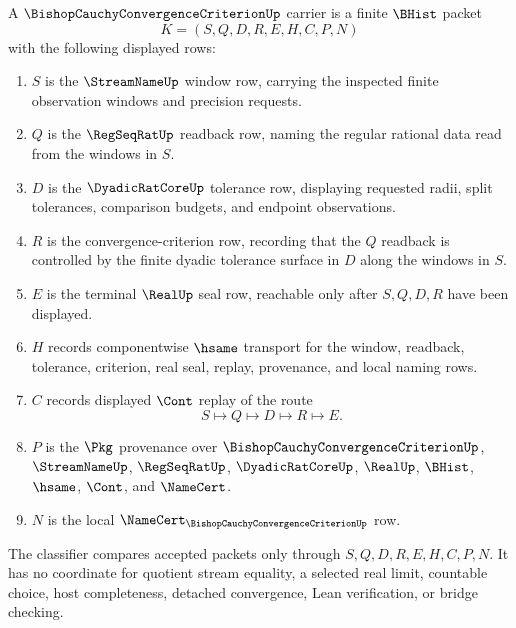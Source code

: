 \begin{definition}
\label{def:bishop-cauchy-convergence-criterion-carrier}
A $\BishopCauchyConvergenceCriterionUp$ carrier is a finite $\BHist$ packet
$$
K=(S,Q,D,R,E,H,C,P,N)
$$
with the following displayed rows:
\begin{enumerate}
\item $S$ is the $\StreamNameUp$ window row, carrying the inspected finite observation windows and precision requests.
\item $Q$ is the $\RegSeqRatUp$ readback row, naming the regular rational data read from the windows in $S$.
\item $D$ is the $\DyadicRatCoreUp$ tolerance row, displaying requested radii, split tolerances, comparison budgets, and endpoint observations.
\item $R$ is the convergence-criterion row, recording that the $Q$ readback is controlled by the finite dyadic tolerance surface in $D$ along the windows in $S$.
\item $E$ is the terminal $\RealUp$ seal row, reachable only after $S,Q,D,R$ have been displayed.
\item $H$ records componentwise $\hsame$ transport for the window, readback, tolerance, criterion, real seal, replay, provenance, and local naming rows.
\item $C$ records displayed $\Cont$ replay of the route
$$
S \longmapsto Q \longmapsto D \longmapsto R \longmapsto E .
$$
\item $P$ is the $\Pkg$ provenance over $\BishopCauchyConvergenceCriterionUp$, $\StreamNameUp$, $\RegSeqRatUp$, $\DyadicRatCoreUp$, $\RealUp$, $\BHist$, $\hsame$, $\Cont$, and $\NameCert$.
\item $N$ is the local $\NameCert_{\BishopCauchyConvergenceCriterionUp}$ row.
\end{enumerate}
The classifier compares accepted packets only through $S,Q,D,R,E,H,C,P,N$. It has no coordinate for quotient stream equality, a selected real limit, countable choice, host completeness, detached convergence, Lean verification, or bridge checking.
\end{definition}

